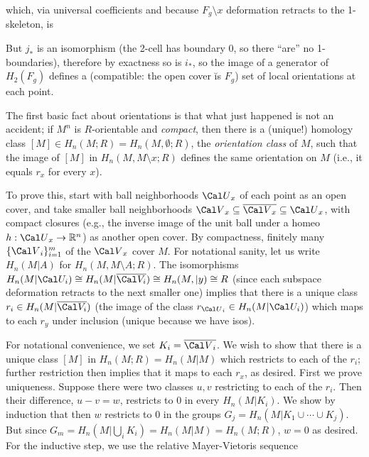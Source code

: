 
\ssk

which, via universal coefficients and because $F_g\setminus x$ deformation retracts to the 1-skeleton, is


\ssk

But $j_*$ is an isomorphism (the 2-cell has boundary 0, so there ``are'' no 1-boundaries),
therefore by exactness so is $i_*$, so the image of a generator of $H_2(F_g)$ defines a (compatible: 
the open cover \u{is} $F_g$) set of local orientations at each point.

\msk

The first basic fact about orientations is that what just happened is not an accident; 
if $M^n$ is $R$-orientable and {\it compact}, then there is a 
(unique!) homology class
$[M]\in H_n(M;R)=H_n(M,\emptyset;R)$, the {\it orientation class} of $M$, such that the image of $[M]$ in 
$H_n(M,M\setminus x;R)$ defines the same orientation on $M$ (i.e., it equals $r_x$ for every $x$). 

\ssk

To prove this, start with ball neighborhoods ${\Cal U}_x$ of each point as an 
open cover, and take smaller ball neighborhoods ${\Cal V}_x\subseteq \overline{{\Cal V}_x}\subseteq {\Cal U}_x$,
with compact closures (e.g., the inverse image of the unit ball under a homeo $h:{\Cal U}_x\ra \bbr^n$)
as another open cover. By compactness, finitely many $\{{\Cal V}_i\}_{i=1}^m$ of the ${\Cal V}_x$ cover $M$. 
For notational sanity, let us write $H_n(M|A)$ for $H_n(M,M\setminus A;R)$.
The isomorphisms $H_n(M|{\Cal U_i})\cong H_n(M|\overline{\Cal V_i})\cong H_n(M,|y)\cong R$
(since each subspace deformation retracts to the next smaller one) implies that there is a unique class
$r_i\in H_n(M|\overline{\Cal V_i})$ (the image of the class $r_{{\Cal U}_i}\in H_n(M|{\Cal U_i})$)
which maps to each $r_y$ under inclusion (unique because we have isos).

\ssk

For notational convenience, we set $K_i=\overline{{\Cal V}_i}$. 
We wish to show that there is a unique class $[M]$ in 
$H_n(M;R) = H_n(M|M)$ which restricts to each of the $r_i$; further restriction then implies that 
it maps to each $r_x$, as desired. First we prove uniqueness. Suppose there were two 
classes $u,v$ restricting to each of the $r_i$. Then their difference, $u-v=w$, restricts to $0$ in 
every $H_n(M|K_i)$. We show by induction that then $w$ restricts to $0$ in the groups
$G_j=H_n(M|K_1\cup\cdots\cup K_j)$. But since $G_m=H_n(M|\bigcup_i K_i)=H_n(M|M)=H_n(M;R)$,
$w=0$ as desired. For the inductive step, we use the relative Mayer-Vietoris sequence

